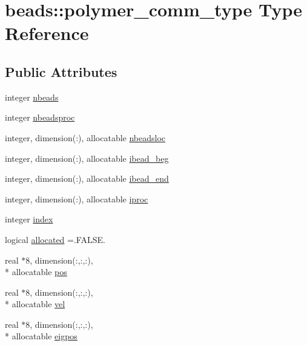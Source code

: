\hypertarget{structbeads_1_1polymer__comm__type}{\section{beads\-:\-:polymer\-\_\-comm\-\_\-type Type Reference}
\label{structbeads_1_1polymer__comm__type}
}
\subsection*{Public Attributes}
\begin{DoxyCompactItemize}
\item 
integer \hyperlink{structbeads_1_1polymer__comm__type_a8a6e8b05d395c41432e8a7cbd1440144}{nbeads}
\item 
integer \hyperlink{structbeads_1_1polymer__comm__type_a2a3e86e94cb6d06fb89efb01a40d037b}{nbeadsproc}
\item 
integer, dimension(\-:), allocatable \hyperlink{structbeads_1_1polymer__comm__type_aca9098ebd87b65bc7b3837de908e63dd}{nbeadsloc}
\item 
integer, dimension(\-:), allocatable \hyperlink{structbeads_1_1polymer__comm__type_afbd32d8fe85cad96e29f843d57d4643d}{ibead\-\_\-beg}
\item 
integer, dimension(\-:), allocatable \hyperlink{structbeads_1_1polymer__comm__type_a6701e344be0e9be64425096c932711bb}{ibead\-\_\-end}
\item 
integer, dimension(\-:), allocatable \hyperlink{structbeads_1_1polymer__comm__type_a99e35a43a52000029a3ab65dd2c93938}{iproc}
\item 
integer \hyperlink{structbeads_1_1polymer__comm__type_a6f34d90af9de91bc1ad5263dc564702f}{index}
\item 
logical \hyperlink{structbeads_1_1polymer__comm__type_a0bca96b549d7c6c1b7e204d70ad1c2e7}{allocated} =.F\-A\-L\-S\-E.
\item 
real $\ast$8, dimension(\-:,\-:,\-:), \\*
allocatable \hyperlink{structbeads_1_1polymer__comm__type_a23768f5c0d2642acaf4a39132b2c5c46}{pos}
\item 
real $\ast$8, dimension(\-:,\-:,\-:), \\*
allocatable \hyperlink{structbeads_1_1polymer__comm__type_af163fba0b99d62e1bc398fd5ea0b1318}{vel}
\item 
real $\ast$8, dimension(\-:,\-:,\-:), \\*
allocatable \hyperlink{structbeads_1_1polymer__comm__type_a48e8cc7efd08040fb11f7f4642fcbd3d}{eigpos}

\end{DoxyCompactItemize}
